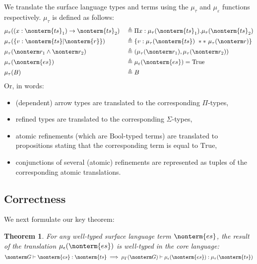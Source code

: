 \documentclass[a4paper]{article}
\newtheorem{theorem}{Theorem}
\begin{document}
We translate the surface language types and terms using the $\mu_\tau$ and $\mu_\varepsilon$ functions respectively.
$\mu_\tau$ is defined as follows:
\begin{equation}
\begin{aligned}
  & \mu_\tau( (x : \nonterm{ts}_1) \rightarrow \nonterm{ts}_2)  && \triangleq \Pi x : \mu_\tau(\nonterm{ts}_1). \mu_\tau(\nonterm{ts}_2)  \\
  & \mu_\tau( \{ v : \nonterm{ts} | \nonterm{r} \})             && \triangleq \{ v : \mu_\tau(\nonterm{ts})\ **\ \mu_\tau(\nonterm r) \}  \\
  & \mu_\tau( \nonterm r_1 \land \nonterm r_2 )                 && \triangleq ( \mu_\tau(\nonterm r_1) , \mu_\tau(\nonterm r_2))          \\
  & \mu_\tau( \nonterm{es} )                                    && \triangleq \mu_\varepsilon(\nonterm{es}) = \text{True}                 \\
  & \mu_\tau(B)                                                 && \triangleq B                                                           \\
\end{aligned}
\end{equation}
Or, in words:
\begin{itemize}
  \item (dependent) arrow types are translated to the corresponding $\Pi$-types,
  \item refined types are translated to the corresponding $\Sigma$-types,
  \item atomic refinements (which are $\text{Bool}$-typed terms) are translated to propositions stating that the corresponding term is equal to $\text{True}$,
  \item conjunctions of several (atomic) refinements are represented as tuples of the corresponding atomic translations.
\end{itemize}


\subsection{Correctness}

We next formulate our key theorem:

\begin{theorem}
  For any well-typed surface language term $\nonterm{es}$,
  the result of the translation $\mu_\epsilon(\nonterm{es})$ is well-typed in the core language:
  \[
    \nonterm G \vdash \nonterm{es} : \nonterm{ts} \implies \mu_\Gamma(\nonterm G) \vdash \mu_\epsilon(\nonterm{es}) : \mu_\tau(\nonterm{ts})
  \]
\end{theorem}
\end{document}
